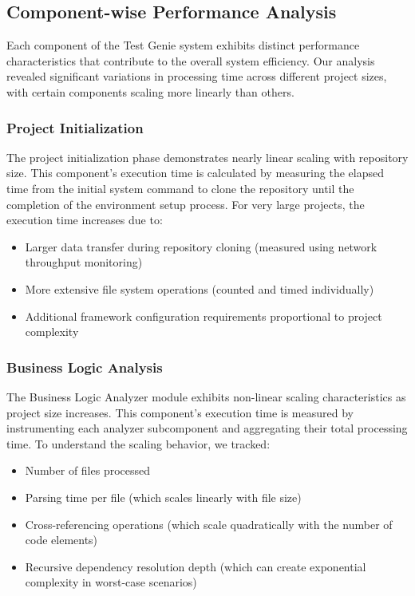 \subsection{Component-wise Performance Analysis}

Each component of the Test Genie system exhibits distinct performance characteristics that contribute to the overall system efficiency. Our analysis revealed significant variations in processing time across different project sizes, with certain components scaling more linearly than others.

\subsubsection{Project Initialization}

The project initialization phase demonstrates nearly linear scaling with repository size. This component's execution time is calculated by measuring the elapsed time from the initial system command to clone the repository until the completion of the environment setup process. For very large projects, the execution time increases due to:

\begin{itemize}
    \item Larger data transfer during repository cloning (measured using network throughput monitoring)
    \item More extensive file system operations (counted and timed individually)
    \item Additional framework configuration requirements proportional to project complexity
\end{itemize}

\subsubsection{Business Logic Analysis}

The Business Logic Analyzer module exhibits non-linear scaling characteristics as project size increases. This component's execution time is measured by instrumenting each analyzer subcomponent and aggregating their total processing time. To understand the scaling behavior, we tracked:

\begin{itemize}
    \item Number of files processed
    \item Parsing time per file (which scales linearly with file size)
    \item Cross-referencing operations (which scale quadratically with the number of code elements)
    \item Recursive dependency resolution depth (which can create exponential complexity in worst-case scenarios)
\end{itemize}

